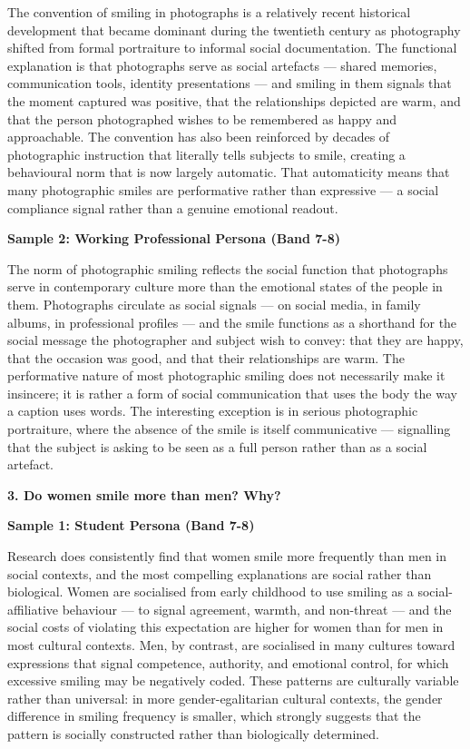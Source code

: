The convention of smiling in photographs is a relatively recent historical development that became dominant during the twentieth century as photography shifted from formal portraiture to informal social documentation. The functional explanation is that photographs serve as social artefacts — shared memories, communication tools, identity presentations — and smiling in them signals that the moment captured was positive, that the relationships depicted are warm, and that the person photographed wishes to be remembered as happy and approachable. The convention has also been reinforced by decades of photographic instruction that literally tells subjects to smile, creating a behavioural norm that is now largely automatic. That automaticity means that many photographic smiles are performative rather than expressive — a social compliance signal rather than a genuine emotional readout.

\textbf{Sample 2: Working Professional Persona (Band 7-8)}

The norm of photographic smiling reflects the social function that photographs serve in contemporary culture more than the emotional states of the people in them. Photographs circulate as social signals — on social media, in family albums, in professional profiles — and the smile functions as a shorthand for the social message the photographer and subject wish to convey: that they are happy, that the occasion was good, and that their relationships are warm. The performative nature of most photographic smiling does not necessarily make it insincere; it is rather a form of social communication that uses the body the way a caption uses words. The interesting exception is in serious photographic portraiture, where the absence of the smile is itself communicative — signalling that the subject is asking to be seen as a full person rather than as a social artefact.

\separator

\begin{ieltsquestion}
\textbf{3. Do women smile more than men? Why?}
\end{ieltsquestion}
\textbf{Sample 1: Student Persona (Band 7-8)}

Research does consistently find that women smile more frequently than men in social contexts, and the most compelling explanations are social rather than biological. Women are socialised from early childhood to use smiling as a social-affiliative behaviour — to signal agreement, warmth, and non-threat — and the social costs of violating this expectation are higher for women than for men in most cultural contexts. Men, by contrast, are socialised in many cultures toward expressions that signal competence, authority, and emotional control, for which excessive smiling may be negatively coded. These patterns are culturally variable rather than universal: in more gender-egalitarian cultural contexts, the gender difference in smiling frequency is smaller, which strongly suggests that the pattern is socially constructed rather than biologically determined.

